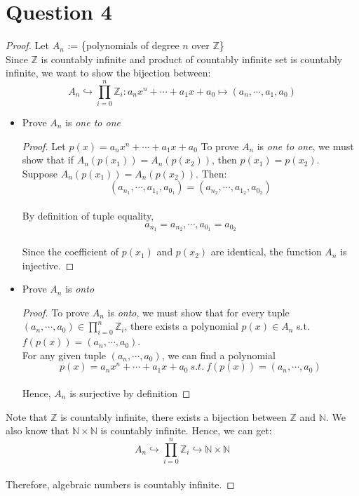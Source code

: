 \documentclass{article}
\begin{document}
\section*{Question 4}
\begin{proof}
    Let $A_n$ := \{polynomials of degree $n$ over $\mathbb{Z}$\}
    \\
    Since $\mathbb{Z}$ is countably infinite and product of countably infinite set is countably infinite, we want to show the bijection between:
    \[ A_n \hookrightarrow \prod_{i=0}^{n}\mathbb{Z}_{i}: a_n x^n + \cdots + a_1 x + a_0 \mapsto (a_n, \cdots, a_1, a_0) \]
    
    \begin{itemize}
        \item Prove $A_n$ is \textit{one to one}
        \begin{proof}
            Let $p(x) = a_n x^n + \cdots + a_1 x + a_0$
            To prove $A_n$ is \textit{one to one}, we must show that if $A_n(p(x_1)) = A_n(p(x_2))$, then $p(x_1) = p(x_2)$.
            \\
            Suppose $A_n(p(x_1)) = A_n(p(x_2))$. Then:
            \[ (a_{n_1}, \cdots, a_{1_1}, a_{0_1}) = (a_{n_2}, \cdots, a_{1_2}, a_{0_2}) \]
            \\
            By definition of tuple equality,
            \[ a_{n_1} = a_{n_2}, \cdots, a_{0_1} = a_{0_2}\]
            \\
            Since the coefficient of $p(x_1)$ and $p(x_2)$ are identical, the function $A_n$ is injective.
        \end{proof}
        \item Prove $A_n$ is \textit{onto}
        \begin{proof}
            To prove $A_n$ is \textit{onto}, we must show that for every tuple $(a_n, \cdots, a_0) \in \prod_{i=0}^{n}\mathbb{Z}_{i}$, there exists a polynomial $p(x) \in A_n$ s.t. $f(p(x)) = (a_n, \cdots, a_0)$.
            \\
            For any given tuple $(a_n, \cdots, a_0)$, we can find a polynomial 
            \[ p(x) = a_n x^n + \cdots + a_1 x + a_0 \ s.t. \ f(p(x)) = (a_n, \cdots, a_0) \]
            \\
            Hence, $A_n$ is surjective by definition
        \end{proof}
    \end{itemize}
    Note that $\mathbb{Z}$ is countably infinite, there exists a bijection between $\mathbb{Z}$ and $\mathbb{N}$. We also know that $\mathbb{N} \times \mathbb{N}$ is countably infinite. Hence, we can get:
    \[ A_n \hookrightarrow \prod_{i=0}^{n}\mathbb{Z}_{i} \hookrightarrow \mathbb{N} \times \mathbb{N} \]
    \\
    Therefore, algebraic numbers is countably infinite.
\end{proof}
\end{document}
